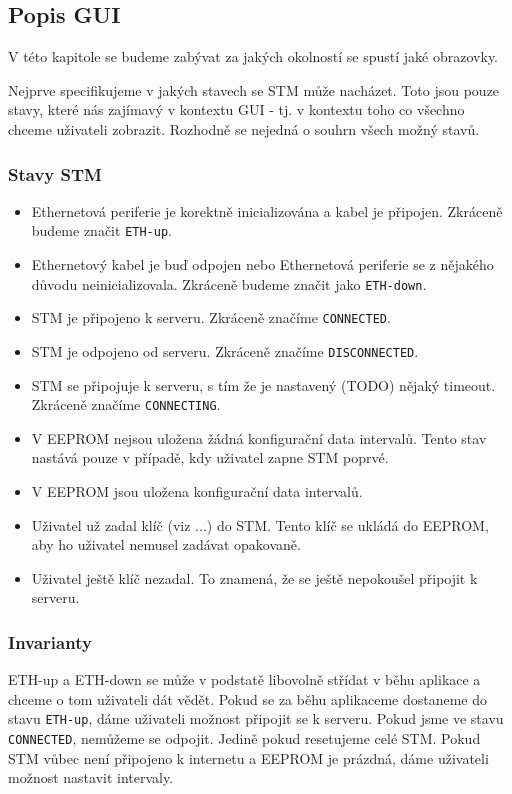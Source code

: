 
\subsection{Popis GUI}
V této kapitole se budeme zabývat za jakých okolností se spustí jaké obrazovky.

Nejprve specifikujeme v jakých stavech se STM může nacházet.
Toto jsou pouze stavy, které nás zajímavý v kontextu GUI - tj. v kontextu toho co všechno chceme
uživateli zobrazit.
Rozhodně se nejedná o souhrn všech možný stavů.
\subsubsection{Stavy STM}
\begin{itemize}
  \item Ethernetová periferie je korektně inicializována a kabel je připojen. Zkráceně budeme
        značit \texttt{ETH-up}.
  \item Ethernetový kabel je buď odpojen nebo Ethernetová periferie se z nějakého důvodu
        neinicializovala. Zkráceně budeme značit jako \texttt{ETH-down}.
  \item STM je připojeno k serveru. Zkráceně značíme \texttt{CONNECTED}.
  \item STM je odpojeno od serveru. Zkráceně značíme \texttt{DISCONNECTED}.
  \item STM se připojuje k serveru, s tím že je nastavený (TODO) nějaký timeout. Zkráceně značíme
        \texttt{CONNECTING}.
  \item V EEPROM nejsou uložena žádná konfigurační data intervalů. Tento stav nastává pouze v případě,
        kdy uživatel zapne STM poprvé.
  \item V EEPROM jsou uložena konfigurační data intervalů.
  \item Uživatel už zadal klíč (viz ...) do STM. Tento klíč se ukládá do EEPROM, aby ho uživatel
        nemusel zadávat opakovaně.
  \item Uživatel ještě klíč nezadal. To znamená, že se ještě nepokoušel připojit k serveru.
\end{itemize}

\subsubsection{Invarianty}
ETH-up a ETH-down se může v podstatě libovolně střídat v běhu aplikace a chceme o tom uživateli
dát vědět.
Pokud se za běhu aplikaceme dostaneme do stavu \texttt{ETH-up}, dáme uživateli možnost připojit
se k serveru.
Pokud jsme ve stavu \texttt{CONNECTED}, nemůžeme se odpojit. Jedině pokud resetujeme celé STM.
Pokud STM vůbec není připojeno k internetu a EEPROM je prázdná, dáme uživateli možnost nastavit
intervaly.

